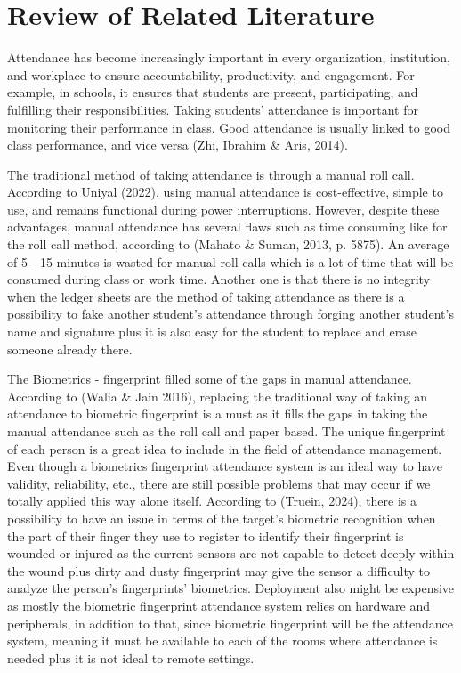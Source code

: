 \chapter{Review of Related Literature}
\label{sec:relatedlit}

Attendance has become increasingly important in every organization, institution, and workplace to ensure accountability, productivity, and engagement. For example, in schools, it ensures that students are present, participating, and fulfilling their responsibilities. Taking students' attendance is important for monitoring their performance in class. Good attendance is usually linked to good class performance, and vice versa (Zhi, Ibrahim \& Aris, 2014).

The traditional method of taking attendance is through a manual roll call. According to Uniyal (2022), using manual attendance is cost-effective, simple to use, and remains functional during power interruptions. However, despite these advantages, manual attendance has several flaws such as time consuming like for the roll call method, according to (Mahato \& Suman, 2013, p. 5875). An average of 5 - 15 minutes is wasted for manual roll calls which is a lot of time that will be consumed during class or work time. Another one is that there is no integrity when the ledger sheets are the method of taking attendance as there is a possibility to fake another student’s attendance through forging another student’s name and signature plus it is also easy for the student to replace and erase someone already there.

The Biometrics - fingerprint filled some of the gaps in manual attendance. According to (Walia \& Jain 2016), replacing the traditional way of taking an attendance to biometric fingerprint is a must as it fills the gaps in taking the manual attendance such as the roll call and paper based. The unique fingerprint of each person is a great idea to include in the field of attendance management. Even though a biometrics fingerprint attendance system is an ideal way to have validity, reliability, etc., there are still possible problems that may occur if we totally applied this way alone itself. According to (Truein, 2024), there is a possibility to have an issue in terms of the target’s biometric recognition when the part of their finger they use to register to identify their fingerprint is wounded or injured as the current sensors are not capable to detect deeply within the wound plus dirty and dusty fingerprint may give the sensor a difficulty to analyze the person’s fingerprints’ biometrics. Deployment also might be expensive as mostly the biometric fingerprint attendance system relies on hardware and peripherals, in addition to that, since biometric fingerprint will be the attendance system, meaning it must be available to each of the rooms where attendance is needed plus it is not ideal to remote settings.

